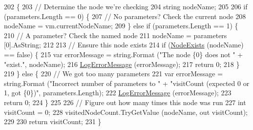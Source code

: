 \begin{DoxyCode}
202         \{
203             \textcolor{comment}{// Determine the node we're checking}
204             \textcolor{keywordtype}{string} nodeName;
205 
206             \textcolor{keywordflow}{if} (parameters.Length == 0) \{
207                 \textcolor{comment}{// No parameters? Check the current node}
208                 nodeName = vm.currentNodeName;
209             \} \textcolor{keywordflow}{else} \textcolor{keywordflow}{if} (parameters.Length == 1) \{
210                 \textcolor{comment}{// A parameter? Check the named node}
211                 nodeName = parameters [0].AsString;
212 
213                 \textcolor{comment}{// Ensure this node exists}
214                 \textcolor{keywordflow}{if} (\hyperlink{a00072_a93bb76a1f9a4058f225ff4cee97483c6}{NodeExists} (nodeName) == \textcolor{keyword}{false}) \{
215                     var errorMessage = string.Format (\textcolor{stringliteral}{"The node \{0\} does not "} + \textcolor{stringliteral}{"exist."}, nodeName);
216                     \hyperlink{a00072_a9801e83dd044d6498fdf6ebcc6bec5ac}{LogErrorMessage} (errorMessage);
217                     \textcolor{keywordflow}{return} 0;
218                 \}
219             \} \textcolor{keywordflow}{else} \{
220                 \textcolor{comment}{// We got too many parameters}
221                 var errorMessage = string.Format (\textcolor{stringliteral}{"Incorrect number of parameters to "} + \textcolor{stringliteral}{"visitCount
       (expected 0 or 1, got \{0\})"}, parameters.Length);
222                 \hyperlink{a00072_a9801e83dd044d6498fdf6ebcc6bec5ac}{LogErrorMessage} (errorMessage);
223                 \textcolor{keywordflow}{return} 0;
224             \}
225 
226             \textcolor{comment}{// Figure out how many times this node was run}
227             \textcolor{keywordtype}{int} visitCount = 0;
228             visitedNodeCount.TryGetValue (nodeName, out visitCount);
229 
230             \textcolor{keywordflow}{return} visitCount;
231         \}
\end{DoxyCode}


